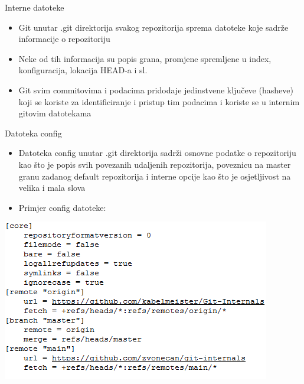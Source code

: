 \begin{frame}{Interne datoteke}
	\begin{itemize}
		\item{Git unutar .git direktorija svakog repozitorija sprema datoteke koje sadrže informacije o repozitoriju}
		\item{Neke od tih informacija su popis grana, promjene spremljene u index, konfiguracija, lokacija HEAD-a i sl.}
		\item{Git svim commitovima i podacima pridodaje jedinstvene ključeve (hasheve) koji se koriste za identificiranje i pristup tim podacima i koriste se u internim gitovim datotekama}
	\end{itemize}
\end{frame}
\begin{frame}{Datoteka config}
	\begin{itemize}
		\item{Datoteka config unutar .git direktorija sadrži osnovne podatke o repozitoriju kao što je popis svih povezanih udaljenih repozitorija, poveznicu na master granu zadanog default repozitorija i interne opcije kao što je osjetljivost na velika i mala slova}
		\item{Primjer config datoteke:}
	\end{itemize}
	\begin{center}
		\includegraphics[width=0.66\linewidth]{img/config.png}
	\end{center}
\end{frame}